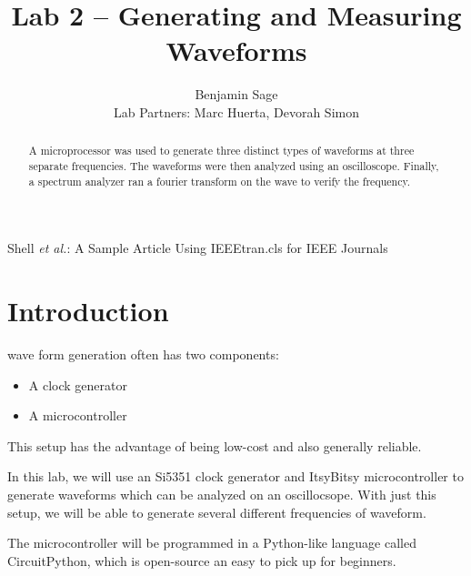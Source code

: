 \documentclass[lettersize,journal]{IEEEtran}
\begin{document}
\title{Lab 2 -- Generating and Measuring Waveforms}

\author{Benjamin Sage\\Lab Partners: Marc Huerta, Devorah Simon}

%
{Shell \MakeLowercase{\textit{et al.}}: A Sample Article Using IEEEtran.cls for IEEE Journals}


\maketitle

\begin{abstract}
A microprocessor was used to generate three distinct types of waveforms at three separate frequencies. The waveforms were then analyzed using an oscilloscope. Finally, a spectrum analyzer ran a fourier transform on the wave to verify the frequency.
\end{abstract}


\section{Introduction}
 wave form generation often has two components:

\begin{itemize}
    \item A clock generator
    \item A microcontroller
\end{itemize}

This setup has the advantage of being low-cost and also generally reliable.

In this lab, we will use an Si5351 clock generator and ItsyBitsy microcontroller to generate waveforms which can be analyzed on an oscillocsope. With just this setup, we will be able to generate several different frequencies of waveform.

The microcontroller will be programmed in a Python-like language called CircuitPython, which is open-source an easy to pick up for beginners.
\end{document}
